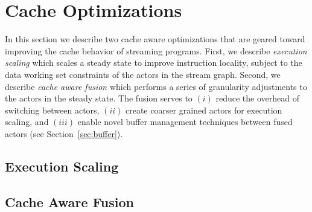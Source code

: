\section{Cache Optimizations}
\label{sec:cache-opt}

In this section we describe two cache aware optimizations that
are geared toward improving the cache behavior of streaming programs. First, we
describe {\it execution scaling} which 
scales a steady state to improve instruction locality, subject to the
data working set constraints of the actors in the stream graph.
Second, we describe {\it cache aware fusion} which performs a series
of granularity adjustments to the actors in the steady state. The
fusion serves to $(i)$ reduce
the overhead of switching between actors, $(ii)$ create coarser
grained actors for execution scaling, and $(iii)$ enable novel
buffer management techniques between fused actors (see Section~\ref{sec:buffer}).

\subsection{Execution Scaling}


\subsection{Cache Aware Fusion}
